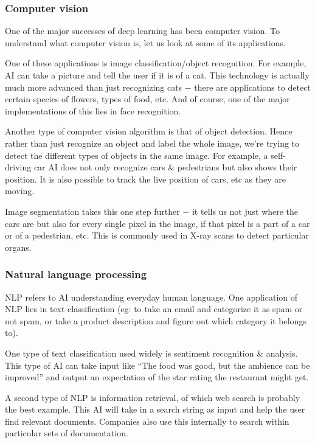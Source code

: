 \documentclass{article}[a4paper,12pt]
\theoremstyle{definition}
\begin{document}
\subsubsection{Computer vision}
One of the major successes of deep learning has been computer vision. To understand what computer vision is, let us look at some of its applications.
\vspace{6pt}

One of these applications is image classification/object recognition. For example, AI can take a picture and tell the user if it is of a cat. This technology is actually much more advanced than just recognizing cats $-$ there are applications to detect certain species of flowers, types of food, etc. And of course, one of the major implementations of this lies in face recognition.
\vspace{6pt}

Another type of computer vision algorithm is that of object detection. Hence rather than just recognize an object and label the whole image, we're trying to detect the different types of objects in the same image. For example, a self-driving car AI does not only recognize cars \& pedestrians but also shows their position. It is also possible to track the live position of cars, etc as they are moving.
\vspace{6pt}

Image segmentation takes this one step further $-$ it tells us not just where the cars are but also for every single pixel in the image, if that pixel is a part of a car or of a pedestrian, etc. This is commonly used in X-ray scans to detect particular organs.
\subsubsection{Natural language processing}
NLP refers to AI understanding everyday human language. One application of NLP lies in text classification (eg: to take an email and categorize it as spam or not spam, or take a product description and figure out which category it belongs to).
\vspace{6pt}

One type of text classification used widely is sentiment recognition \& analysis. This type of AI can take input like ``The food was good, but the ambience can be improved'' and output an expectation of the star rating the restaurant might get.
\vspace{6pt}

A second type of NLP is information retrieval, of which web search is probably the best example. This AI will take in a search string as input and help the user find relevant documents. Companies also use this internally to search within particular sets of documentation.
\vspace{6pt}
\end{document}
